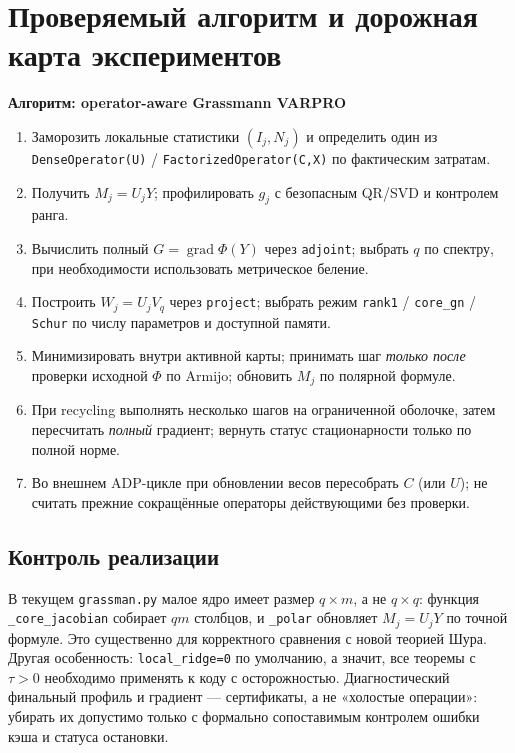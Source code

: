 \documentclass[10.5pt,a4paper]{article}
\DeclareMathOperator{\grad}{grad}
\numberwithin{equation}{section}
\theoremstyle{plain}
\theoremstyle{definition}
\begin{document}
\section{Проверяемый алгоритм и дорожная карта экспериментов}
\begin{mainbox}
{\sffamily\bfseries\color{navy} Алгоритм: operator-aware Grassmann VARPRO}\par\smallskip
\begin{enumerate}
\item Заморозить локальные статистики $(I_j,N_j)$ и определить один из \texttt{DenseOperator(U)} / \texttt{FactorizedOperator(C,X)} по фактическим затратам.
\item Получить $M_j=U_jY$; профилировать $g_j$ с безопасным QR/SVD и контролем ранга.
\item Вычислить полный $G=\grad\Phi(Y)$ через \texttt{adjoint}; выбрать $q$ по спектру, при необходимости использовать метрическое беление.
\item Построить $W_j=U_jV_q$ через \texttt{project}; выбрать режим \texttt{rank1} / \texttt{core\_gn} / \texttt{Schur} по числу параметров и доступной памяти.
\item Минимизировать внутри активной карты; принимать шаг \emph{только после} проверки исходной $\Phi$ по Armijo; обновить $M_j$ по полярной формуле.
\item При recycling выполнять несколько шагов на ограниченной оболочке, затем пересчитать \emph{полный} градиент; вернуть статус стационарности только по полной норме.
\item Во внешнем ADP-цикле при обновлении весов пересобрать $C$ (или $U$); не считать прежние сокращённые операторы действующими без проверки.
\end{enumerate}
\end{mainbox}

\subsection{Контроль реализации}
В текущем \texttt{grassman.py} малое ядро имеет размер $q\times m$, а не $q\times q$: функция \texttt{\_core\_jacobian} собирает $qm$ столбцов, и \texttt{\_polar} обновляет $M_j=U_jY$ по точной формуле. Это существенно для корректного сравнения с новой теорией Шура. Другая особенность: \texttt{local\_ridge=0} по умолчанию, а значит, все теоремы с $\tau>0$ необходимо применять к коду с осторожностью. Диагностический финальный профиль и градиент --- сертификаты, а не «холостые операции»: убирать их допустимо только с формально сопоставимым контролем ошибки кэша и статуса остановки.
\end{document}
